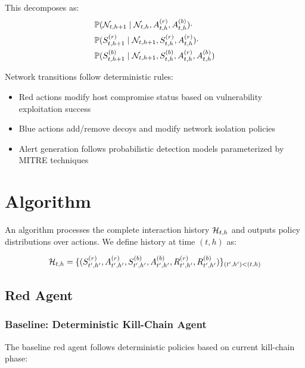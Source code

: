 \documentclass[11pt]{article}
\newcounter{phase}[algorithm]
\theoremstyle{definition}
\theoremstyle{plain}
\begin{document}
This decomposes as:
\begin{align}
&\mathbb{P}(\mathcal{N}_{t,h+1} \mid \mathcal{N}_{t,h}, A_{t,h}^{(r)}, A_{t,h}^{(b)}) \cdot \\
&\mathbb{P}(S_{t,h+1}^{(r)} \mid \mathcal{N}_{t,h+1}, S_{t,h}^{(r)}, A_{t,h}^{(r)}) \cdot \\
&\mathbb{P}(S_{t,h+1}^{(b)} \mid \mathcal{N}_{t,h+1}, S_{t,h}^{(b)}, A_{t,h}^{(r)}, A_{t,h}^{(b)})
\end{align}

Network transitions follow deterministic rules:
\begin{itemize}
    \item Red actions modify host compromise status based on vulnerability exploitation success
    \item Blue actions add/remove decoys and modify network isolation policies
    \item Alert generation follows probabilistic detection models parameterized by MITRE techniques
\end{itemize}

\section{Algorithm}

An algorithm processes the complete interaction history $\mathcal{H}_{t,h}$ and outputs policy distributions over actions. We define history at time $(t,h)$ as:

\begin{equation}
\mathcal{H}_{t,h} = \{(S_{t',h'}^{(r)}, A_{t',h'}^{(r)}, S_{t',h'}^{(b)}, A_{t',h'}^{(b)}, R_{t',h'}^{(r)}, R_{t',h'}^{(b)})\}_{(t',h') < (t,h)}
\end{equation}

\subsection{Red Agent}

\subsubsection{Baseline: Deterministic Kill-Chain Agent}
The baseline red agent follows deterministic policies based on current kill-chain phase:
\end{document}
